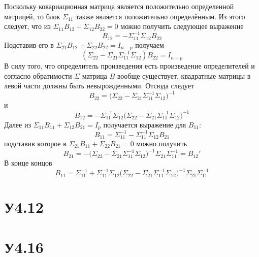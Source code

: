 \documentclass[a4paper]{article}
\begin{document}
Поскольку ковариационная матрица является положительно определенной матрицей,
то блок $\Sigma_{11}$ также является положительно определённым. Из этого следует,
что из $\Sigma_{11}B_{12} + \Sigma_{12}B_{22}=0$ можно получить следующее выражение
\[B_{12} = -\Sigma_{11}^{-1} \Sigma_{12}B_{22}\]
Подставив его в $\Sigma_{21}B_{12} + \Sigma_{22}B_{22} = I_{n-p}$ получаем
\[
( \Sigma_{22} - \Sigma_{21}\Sigma_{11}^{-1} \Sigma_{12} ) B_{22} = I_{n-p}
\]
В силу того, что определитель произведения есть произведение определителей
и согласно обратимости $\Sigma$ матрица $B$ вообще существует, квадратные
матрицы в левой части должны быть невырожденными. Отсюда следует
\[
B_{22} = \bigl( \Sigma_{22} - \Sigma_{21}\Sigma_{11}^{-1} \Sigma_{12} \bigr)^{-1}
\]
и
\[
B_{12} = -\Sigma_{11}^{-1} \Sigma_{12} \bigl( \Sigma_{22} - \Sigma_{21}\Sigma_{11}^{-1} \Sigma_{12} \bigr)^{-1}
\]
Далее из $\Sigma_{11}B_{11} + \Sigma_{12}B_{21} = I_p$ получается выражение для $B_{11}$:
\[ B_{11} = \Sigma_{11}^{-1} - \Sigma_{11}^{-1}\Sigma_{12}B_{21}\]
подставив которое в $\Sigma_{21}B_{11} + \Sigma_{22}B_{21}=0$ можно получить
\[ 
B_{21}
= - \bigl(\Sigma_{22} - \Sigma_{21}\Sigma_{11}^{-1}\Sigma_{12} \bigr)^{-1} \Sigma_{21}\Sigma_{11}^{-1}
= B_{12}'
\]
В конце концов
\[
B_{11}
= \Sigma_{11}^{-1} + \Sigma_{11}^{-1}\Sigma_{12}
		\bigl(\Sigma_{22} - \Sigma_{21}\Sigma_{11}^{-1}\Sigma_{12} \bigr)^{-1}
	\Sigma_{21}\Sigma_{11}^{-1}
\]




\section{У4.12} %
\label{sec:problem_4_12}


\section{У4.16} %
\label{sec:problem_4_16}


\end{document}
